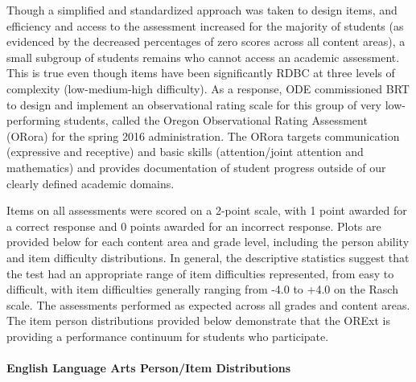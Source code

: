 \documentclass[]{article}
\let\oldparagraph\paragraph
\renewcommand{\paragraph}[1]{\oldparagraph{#1}\mbox{}}
\begin{document}
Though a simplified and standardized approach was taken to design items,
and efficiency and access to the assessment increased for the majority
of students (as evidenced by the decreased percentages of zero scores
across all content areas), a small subgroup of students remains who
cannot access an academic assessment. This is true even though items
have been significantly RDBC at three levels of complexity
(low-medium-high difficulty). As a response, ODE commissioned BRT to
design and implement an observational rating scale for this group of
very low-performing students, called the Oregon Observational Rating
Assessment (ORora) for the spring 2016 administration. The ORora targets
communication (expressive and receptive) and basic skills
(attention/joint attention and mathematics) and provides documentation
of student progress outside of our clearly defined academic domains.

Items on all assessments were scored on a 2-point scale, with 1 point
awarded for a correct response and 0 points awarded for an incorrect
response. Plots are provided below for each content area and grade
level, including the person ability and item difficulty distributions.
In general, the descriptive statistics suggest that the test had an
appropriate range of item difficulties represented, from easy to
difficult, with item difficulties generally ranging from -4.0 to +4.0 on
the Rasch scale. The assessments performed as expected across all grades
and content areas. The item person distributions provided below
demonstrate that the ORExt is providing a performance continuum for
students who participate.

\hypertarget{english-language-arts-personitem-distributions}{%
\paragraph{English Language Arts Person/Item
Distributions}\label{english-language-arts-personitem-distributions}}

\FloatBarrier
\end{document}
